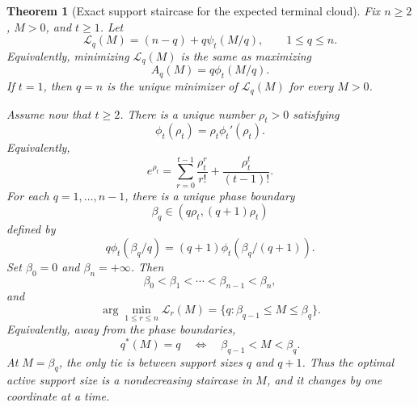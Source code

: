 \documentclass[11pt]{article}
\newtheorem{theorem}{Theorem}
\theoremstyle{definition}
\theoremstyle{remark}
\newcommand{\1}{\mathbf 1}
\begin{document}
\begin{theorem}[Exact support staircase for the expected terminal cloud]
\label{thm:terminal-cloud-staircase}
Fix \(n\ge2\), \(M>0\), and \(t\ge1\).  Let
\[
  \mathcal L_q(M)=(n-q)+q\psi_t(M/q),
  \qquad 1\le q\le n.
\]
Equivalently, minimizing \(\mathcal L_q(M)\) is the same as maximizing
\[
  A_q(M)=q\phi_t(M/q).
\]
If \(t=1\), then \(q=n\) is the unique minimizer of \(\mathcal L_q(M)\) for every \(M>0\).

Assume now that \(t\ge2\).  There is a unique number \(\rho_t>0\) satisfying
\[
  \phi_t(\rho_t)=\rho_t\phi_t'(\rho_t).
\]
Equivalently,
\[
  e^{\rho_t}
  =
  \sum_{r=0}^{t-1}\frac{\rho_t^r}{r!}
  +\frac{\rho_t^t}{(t-1)!}.
\]
For each \(q=1,\ldots,n-1\), there is a unique phase boundary
\[
  \beta_q\in(q\rho_t,(q+1)\rho_t)
\]
defined by
\[
  q\phi_t(\beta_q/q)
  =(q+1)\phi_t(\beta_q/(q+1)).
\]
Set \(\beta_0=0\) and \(\beta_n=+\infty\).  Then
\[
  \beta_0<\beta_1<\cdots<\beta_{n-1}<\beta_n,
\]
and
\[
  \arg\min_{1\le r\le n}\mathcal L_r(M)
  =
  \{q:\beta_{q-1}\le M\le\beta_q\}.
\]
Equivalently, away from the phase boundaries,
\[
  q^*(M)=q
  \quad\Longleftrightarrow\quad
  \beta_{q-1}<M<\beta_q.
\]
At \(M=\beta_q\), the only tie is between support sizes \(q\) and \(q+1\).  Thus the optimal active support size is a nondecreasing staircase in \(M\), and it changes by one coordinate at a time.
\end{theorem}
\end{document}
